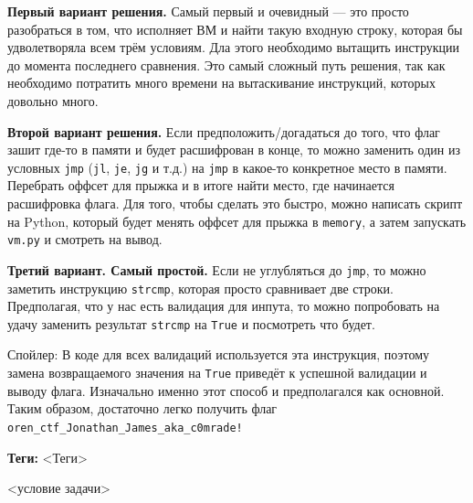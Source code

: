 \documentclass[idxtotoc,hyperref,openany,oneside]{files/reverse} %
\begin{document}
\textbf{Первый вариант решения.}
Самый первый и очевидный — это просто разобраться в том, что исполняет ВМ и найти такую входную строку, которая бы удволетворяла всем трём условиям. Дла этого необходимо вытащить инструкции до момента последнего сравнения. Это самый сложный путь решения, так как необходимо потратить много времени на вытаскивание инструкций, которых довольно много.

\textbf{Второй вариант решения.}
Если предположить/догадаться до того, что флаг зашит где-то в памяти и будет расшифрован в конце, то можно заменить один из условных \verb|jmp| (\verb|jl|, \verb|je|, \verb|jg| и т.д.) на \verb|jmp| в какое-то конкретное место в памяти. Перебрать оффсет для прыжка и в итоге найти место, где начинается расшифровка флага. Для того, чтобы сделать это быстро, можно написать скрипт на Python, который будет менять оффсет для прыжка в \verb|memory|, а затем запускать \verb|vm.py| и смотреть на вывод.

\textbf{Третий вариант. Самый простой.}
Если не углубляться до \verb|jmp|, то можно заметить инструкцию \verb|strcmp|, которая просто сравнивает две строки. Предполагая, что у нас есть валидация для инпута, то можно попробовать на удачу заменить результат \verb|strcmp| на \verb|True| и посмотреть что будет.

Спойлер: В коде для всех валидаций используется эта инструкция, поэтому замена возвращаемого значения на \verb|True| приведёт к успешной валидации и выводу флага. Изначально именно этот способ и предполагался как основной. Таким образом, достаточно легко получить флаг \verb|oren_ctf_Jonathan_James_aka_c0mrade!|


\textbf{Теги:} <Теги>\vspace{\baselineskip}

\begin{tcolorbox}
<условие задачи>
\end{tcolorbox}

\end{document}
